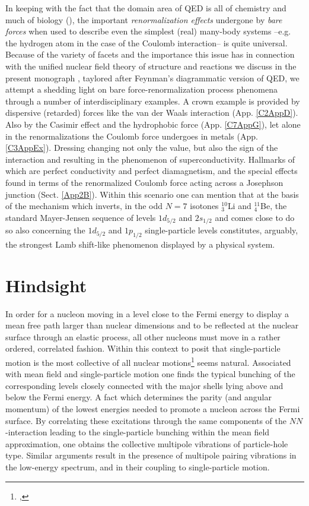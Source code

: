 In keeping with the fact that the domain area of QED is all of chemistry and much of biology (\cite{Feynman:06}), the important \textit{renormalization effects} undergone by \textit{bare forces} when used to describe even the simplest (real) many-body systems --e.g. the hydrogen atom in the case of the Coulomb interaction-- is quite universal. Because of the variety of facets and the importance this issue has in connection with the unified nuclear field theory of structure and reactions we discuss in the present monograph , taylored after Feynman's diagrammatic version of QED, we attempt a shedding light on bare force-renormalization process phenomena through a number of interdisciplinary examples. A crown example is provided by dispersive (retarded) forces like the van der Waals interaction (App. \ref{C2AppD}). Also by the Casimir effect and the hydrophobic force (App. \ref{C7AppG}), let alone in the renormalizations the Coulomb force undergoes in metals (App. \ref{C3AppEx}). Dressing changing not only the value, but also the sign of the interaction and resulting in the phenomenon of superconductivity. Hallmarks of which are perfect conductivity and perfect diamagnetism, and the special effects found in terms of the renormalized Coulomb force acting across a Josephson junction (Sect. \ref{App2B}). Within this scenario one can mention that at the basis of the mechanism which inverts, in the odd $N=7$ isotones $^{10}_3$Li and $^{11}_4$Be, the standard Mayer-Jensen sequence of levels $1d_{5/2}$ and $2s_{1/2}$ and comes close to do so also concerning the $1d_{5/2}$ and $1p_{1/2}$ single-particle levels constitutes, arguably, the strongest Lamb shift-like phenomenon displayed by a physical system.
\section{Hindsight}\label{Sect1.10}
In order for a nucleon moving in a level close to the Fermi energy to display a mean free path larger than nuclear dimensions and to be reflected at the nuclear surface through an elastic process, all other nucleons must move in a rather ordered, correlated fashion. Within this context to posit that single-particle motion is the most collective of all nuclear motions\footnote{\cite{Mottelson:62},} seems natural. Associated with mean field and single-particle motion one finds the typical bunching of the corresponding levels closely connected with the major shells lying above and below the Fermi energy. A fact which determines the parity (and angular momentum) of the lowest energies needed to promote a nucleon across the Fermi surface.  By correlating these excitations through the same components of the $NN$-interaction leading to the single-particle bunching within the mean field approximation, one obtains the collective multipole  vibrations of particle-hole type. Similar arguments result in the presence of multipole pairing vibrations in the low-energy spectrum, and in their coupling to single-particle motion.

